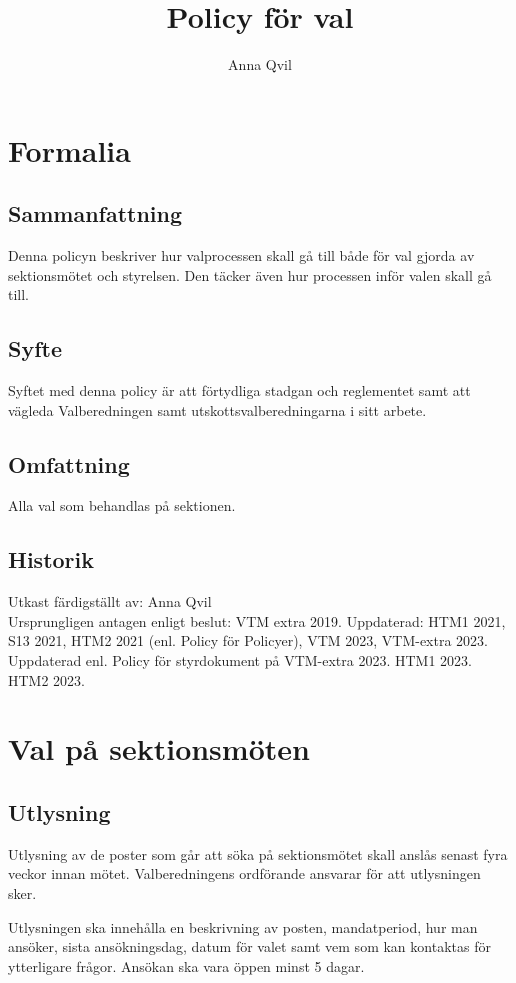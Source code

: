 \documentclass{dsekprotokoll}
\title{Policy för val}
\author{Anna Qvil}
\begin{document}
\maketitle
\section{Formalia}
\subsection{Sammanfattning}
Denna policyn beskriver hur valprocessen skall gå till både för val gjorda av sektionsmötet och styrelsen. Den täcker även hur processen inför valen skall gå till.

\subsection{Syfte}
Syftet med denna policy är att förtydliga stadgan och reglementet samt att vägleda Valberedningen samt utskottsvalberedningarna i sitt arbete.

\subsection{Omfattning}
Alla val som behandlas på sektionen.

\subsection{Historik}
Utkast färdigställt av: Anna Qvil \\
Ursprungligen antagen enligt beslut: VTM extra 2019.
Uppdaterad: HTM1 2021, S13 2021, HTM2 2021 (enl. Policy för Policyer), VTM 2023, VTM-extra 2023. Uppdaterad enl. Policy för styrdokument på VTM-extra 2023. HTM1 2023. HTM2 2023.


\section{Val på sektionsmöten}

\subsection{Utlysning}
Utlysning av de poster som går att söka på sektionsmötet skall anslås senast fyra veckor innan mötet. Valberedningens ordförande ansvarar för att utlysningen sker.

Utlysningen ska innehålla en beskrivning av posten, mandatperiod, hur man ansöker, sista  ansökningsdag, datum för valet samt vem som kan kontaktas för ytterligare frågor. Ansökan ska vara öppen minst 5 dagar.
\end{document}
